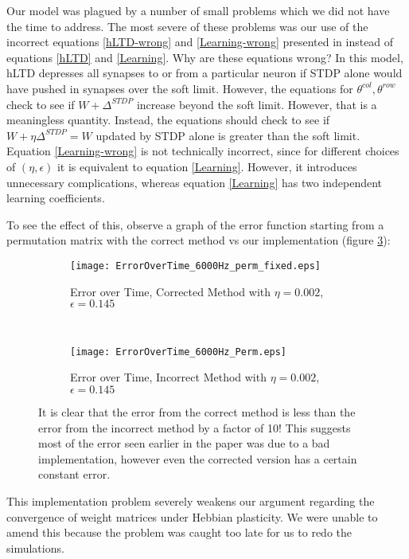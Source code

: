Our model was plagued by a number of small problems which we did not have the time to address. The most severe of these problems was our use of the incorrect equations \eqref{hLTD-wrong} and \eqref{Learning-wrong} presented in \cite{Fiete} instead of equations \eqref{hLTD} and \eqref{Learning}. Why are these equations wrong? In this model, hLTD depresses all synapses to or from a particular neuron if STDP alone would have pushed in synapses over the soft limit. However, the equations for \(\theta^{col},\theta^{row}\) check to see if \(W + \Delta^{STDP}\) increase beyond the soft limit. However, that is a meaningless quantity. Instead, the equations should check to see if \(W + \eta\Delta^{STDP} = W\) updated by STDP alone is greater than the soft limit. Equation \eqref{Learning-wrong} is not technically incorrect, since for different choices of \((\eta,\epsilon)\) it is equivalent to equation \eqref{Learning}. However, it introduces unnecessary complications, whereas equation \eqref{Learning} has two independent learning coefficients.

To see the effect of this, observe a graph of the error function starting from a permutation matrix with the correct method vs our implementation (figure \ref{EoT}):

\begin{figure}[H]
\centering
\begin{subfigure}[b]{0.49\textwidth}
\texttt{[image: ErrorOverTime\_6000Hz\_perm\_fixed.eps]}
\caption{Error over Time, Corrected Method with \(\eta = 0.002\), \(\epsilon = 0.145\)}
\label{EoT: fixed}
\end{subfigure}
\,
\begin{subfigure}[b]{0.49\textwidth}
\texttt{[image: ErrorOverTime\_6000Hz\_Perm.eps]}
\caption{Error over Time, Incorrect Method with \(\eta = 0.002\), \(\epsilon = 0.145\)}
\label{EoT: broken}
\end{subfigure}
\caption{It is clear that the error from the correct method is less than the error from the incorrect method by a factor of 10! This suggests most of the error seen earlier in the paper was due to a bad implementation, however even the corrected version has a certain constant error.}
\label{EoT}
\end{figure}

This implementation problem severely weakens our argument regarding the convergence of weight matrices under Hebbian plasticity. We were unable to amend this because the problem was caught too late for us to redo the simulations. 

